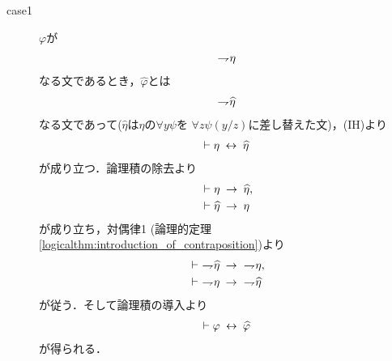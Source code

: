\begin{sketch}
\begin{description}
			\begin{description}
				\item[case1] $\varphi$が
					\begin{align}
						\rightharpoondown\hspace{-0.25em} \eta
					\end{align}
					なる文であるとき，$\widehat{\varphi}$とは
					\begin{align}
						\rightharpoondown\hspace{-0.25em} \widehat{\eta}
					\end{align}
					なる文であって($\widehat{\eta}$は$\eta$の$\forall y \psi$を
					$\forall z \psi(y/z)$に差し替えた文)，(IH)より
					\begin{align}
						\vdash \eta \hspace{0.25em}\leftrightarrow\hspace{0.25em} \widehat{\eta}
					\end{align}
					が成り立つ．論理積の除去より
					\begin{align}
						&\vdash \eta \hspace{0.25em}\rightarrow\hspace{0.25em} \widehat{\eta}, \\
						&\vdash \widehat{\eta} \hspace{0.25em}\rightarrow\hspace{0.25em} \eta
					\end{align}
					が成り立ち，対偶律1
					(論理的定理\ref{logicalthm:introduction_of_contraposition})より
					\begin{align}
						&\vdash\ \negation \widehat{\eta} \rarrow\ \negation \eta, \\
						&\vdash\ \negation \eta \rarrow\ \negation \widehat{\eta}
					\end{align}
					が従う．そして論理積の導入より
					\begin{align}
						\vdash \varphi \hspace{0.25em}\leftrightarrow\hspace{0.25em} \widehat{\varphi}
					\end{align}
					が得られる．
				
					

\end{description}
\end{description}
\end{sketch}
